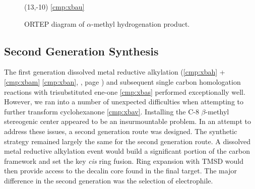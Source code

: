 \begin{figure}[h]
\begin{textblock}{1}
  \end{textblock}
   \begin{textblock}{1}(13,-10) \textsf{\scriptsize{\ref{cmp:xbau}}} \end{textblock}
  \caption{ORTEP diagram of $\alpha$-methyl hydrogenation product.}
  \label{fig:alphamethylcrystal}
\end{figure}


\subsection{Second Generation Synthesis}

The first generation dissolved metal reductive alkylation (\ref{cmp:xbah} + \ref{cmp:xbam} \ce{->}
\ref{cmp:xban}, , page \pageref{sch:forwardgenone}) and subsequent single
carbon homologation reactions with trisubstituted ene-one \ref{cmp:xbas} performed exceptionally
well. However, we ran into a number of unexpected difficulties when attempting to further transform
cyclohexanone \ref{cmp:xbav}. Installing the C-8 $\beta$-methyl stereogenic
center appeared to be an insurmountable problem. In an attempt to address
these issues, a second generation route was designed. The synthetic strategy remained largely the
same for the second generation route. A dissolved metal reductive alkylation event would build a significant portion of the carbon framework and set the key
\textit{cis} ring fusion. Ring expansion with TMSD would then provide access to the decalin core
found in the final target. The major difference in the second generation was the selection of
electrophile.

